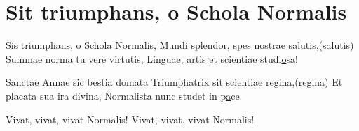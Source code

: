 \section{Sit triumphans, o Schola Normalis}
\subtitle{Sul “Salve invicta Juditha formosa” di A. Vivaldi}

\subtitle{Si ripete tutto due volte a gruppi di due versi, vivat esclusi}
\begin{canzone}
Sis triumphans, o Schola Normalis,
Mundi splendor, spes nostrae salutis,\hfill (salutis)
Summae norma tu vere virtutis,
Linguae, artis et scientiae studi\underline{o}sa!

Sanctae Annae sic bestia domata
Triumphatrix sit scientiae regina,\hfill (regina)
Et placata sua ira divina,
Normalista nunc studet in p\underline{a}ce.

Vivat, vivat, vivat Normalis!
Vivat, vivat, vivat Normalis!
\end{canzone}
